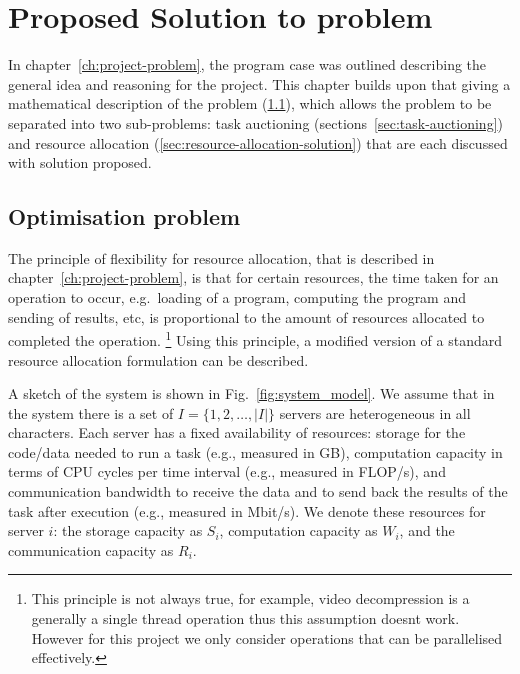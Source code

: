 \chapter{Proposed Solution to problem}\label{ch:proposed-solution-to-problem}
In chapter~\ref{ch:project-problem}, the program case was outlined describing the general idea and reasoning for the
project. This chapter builds upon that giving a mathematical description of the problem (\ref{sec:optimisation-problem}),
which allows the problem to be separated into two sub-problems: task auctioning (sections~\ref{sec:task-auctioning})
and resource allocation (\ref{sec:resource-allocation-solution}) that are each discussed with solution proposed.

\section{Optimisation problem}\label{sec:optimisation-problem}

The principle of flexibility for resource allocation, that is described in chapter~\ref{ch:project-problem}, is that
for certain resources, the time taken for an operation to occur, e.g.\ loading of a program, computing the program and
sending of results, etc, is proportional to the amount of resources allocated to completed the operation.
\footnote{This principle is not always true, for example, video decompression is a generally a single
thread operation thus this assumption doesnt work. However for this project we only consider operations that can be
parallelised effectively.}
Using this principle, a modified version of a standard resource allocation formulation can be described.

A sketch of the system is shown in Fig.~\ref{fig:system_model}.
We assume that in the system there is a set of $I = \{1,2,\ldots,\left|I\right|\}$ servers are heterogeneous in all
characters. Each server has a fixed availability of resources: storage for the code/data needed to run a task
(e.g., measured in GB), computation capacity in terms of CPU cycles per time interval (e.g., measured in FLOP/s),
and communication bandwidth to receive the data and to send back the results of the task after execution (e.g., measured in Mbit/s).
We denote these resources for server $i$: the storage capacity as $S_i$, computation capacity as $W_i$, and the communication capacity as $R_i$.

